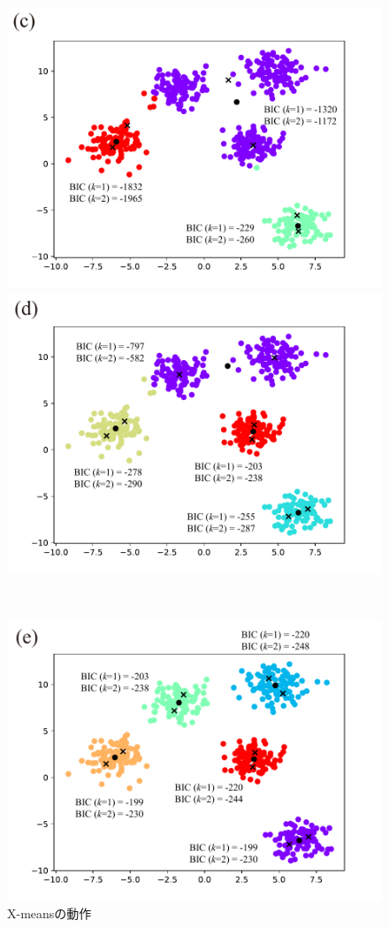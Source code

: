 \begin{figure}[htbp]
\begin{minipage}{0.5\hsize}
    \begin{center}
      \includegraphics[width=1\linewidth]{img/xmeans/c.pdf}
    \end{center}
  \end{minipage}
  \begin{minipage}{0.5\hsize}
    \begin{center}
      \includegraphics[width=1\linewidth]{img/xmeans/d.pdf}
    \end{center}
  \end{minipage}\\
  \begin{center}
    \includegraphics[width=0.5\linewidth]{img/xmeans/e.pdf}
  \end{center}
  \caption{X-meansの動作}
  \label{fig:x-means}
\end{figure}

